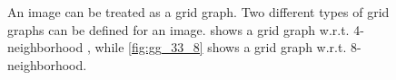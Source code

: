 \begin{figure}
  \begin{center}
  \hspace{1cm}
  \hspace{1cm}
  \end{center}
  \caption[An image treaded as grid graph]{
  An image  can be treated as a grid graph. 
  Two different types of grid graphs can be defined for an image.
   shows a grid graph w.r.t. 4-neighborhood , while
  \cref{fig:gg_33_8} shows a grid graph w.r.t. 8-neighborhood.  
  }\label{fig:grid_graph}
\end{figure}


